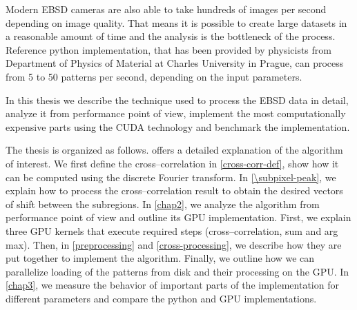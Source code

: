 Modern EBSD cameras are also able to take hundreds of images per second depending on image quality. That means it is possible to create large datasets in a reasonable amount of time and the analysis is the bottleneck of the process. Reference python implementation, that has been provided by physicists from Department of Physics of Material at Charles University in Prague, can process from 5 to 50 patterns per second, depending on the input parameters.

In this thesis we describe the technique used to process the EBSD data in detail, analyze it from performance point of view, implement the most computationally expensive parts using the CUDA technology and benchmark the implementation.

The thesis is organized as follows.  offers a detailed explanation of the algorithm of interest. We first define the cross--correlation in \cref{cross-corr-def}, show how it can be computed using the discrete Fourier transform. In \cref{\subpixel-peak}, we explain how to process the cross--correlation result to obtain the desired vectors of shift between the subregions. In \cref{chap2}, we analyze the algorithm from performance point of view and outline its GPU implementation. First, we explain three GPU kernels that execute required steps (cross--correlation, sum and arg max). Then, in \cref{preprocessing} and \cref{cross-processing}, we describe how they are put together to implement the algorithm. Finally, we outline how we can parallelize loading of the patterns from disk and their processing on the GPU. In \cref{chap3}, we measure the behavior of important parts of the implementation for different parameters and compare the python and GPU implementations.


